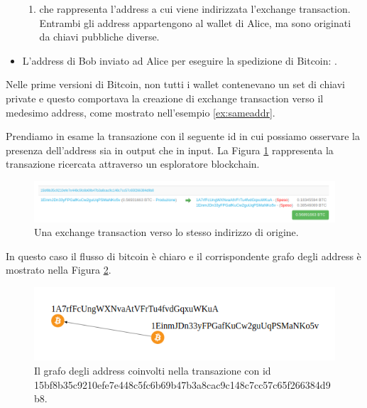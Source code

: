 \begin{example}
\begin{itemize}
\begin{enumerate}
      \item {} che rappresenta l’address a cui viene indirizzata l’exchange transaction. Entrambi gli address appartengono al wallet di Alice, ma sono originati da chiavi pubbliche diverse.
      \end{enumerate}
      \item L’address di Bob inviato ad Alice per eseguire la spedizione di Bitcoin: .
    \end{itemize}
  \end{example}

Nelle prime versioni di Bitcoin, non tutti i wallet contenevano un set di chiavi private e questo comportava la creazione di exchange transaction verso il medesimo address, come mostrato nell'esempio \ref{ex:sameaddr}.

\begin{example}\label{ex:sameaddr}

  Prendiamo in esame la transazione con il seguente id  in cui possiamo osservare la presenza dell’address  sia in output che in input.
  La Figura \ref{fig:exchangeaddressrecicle} rappresenta la transazione ricercata attraverso un esploratore blockchain.

\begin{figure}
\centering
  \includegraphics[scale=0.35]{images/exampleWithGraph/exchange-tx-with-same-address.png}
  \caption{Una exchange transaction verso lo stesso indirizzo di origine\cite{blockstream:esplora}.\label{fig:exchangeaddressrecicle}}
\end{figure}

  In questo caso il flusso di bitcoin è chiaro e il corrispondente grafo degli address è mostrato  nella Figura \ref{fig:graphAddresssameaddresschange}.

\begin{figure}
\centering
  \includegraphics[scale=0.48]{images/exampleWithGraph/exchange-tx-with-same-address-graph.png}
  \caption{Il grafo degli address coinvolti nella transazione con id 15bf8\-b35c9210\-efe7e448c5fc\-6b69b47b3a\-8cac9c14\-8c7cc57c6\-5f26638\-4d9b8.\label{fig:graphAddresssameaddresschange}}
\end{figure}
\end{example}

